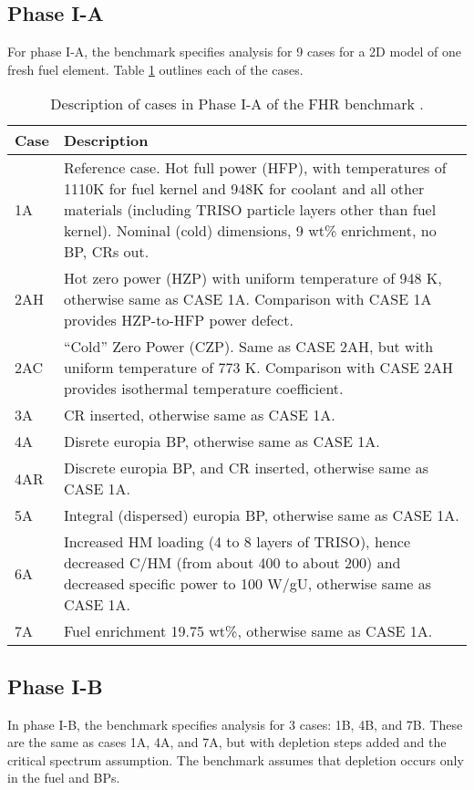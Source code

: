 \subsection{Phase I-A}
For phase I-A, the benchmark specifies analysis for 9 cases for a 2D model of 
one fresh fuel element. 
Table \ref{tab:phase1a-cases} outlines each of the cases. 
\begin{table}[H]
    \centering
    \onehalfspacing
    \caption{Description of cases in Phase I-A of the \gls{FHR} benchmark \cite{noauthor_fluoride_nodate}.}
	\label{tab:phase1a-cases}
    \footnotesize
    \begin{tabular}{p{}|p{}}
    \hline 
    \textbf{Case} & \textbf{Description} \\
    \hline
    1A & Reference case. Hot full power (HFP), with temperatures of 1110K for 
    fuel kernel and 948K for coolant and all other materials (including TRISO 
    particle layers other than fuel kernel). Nominal (cold) dimensions, 
    9 wt\% enrichment, no \gls{BP}, \glspl{CR} out.\\
    \hline
    2AH & Hot zero power (HZP) with uniform temperature of 948 K, 
    otherwise same as CASE 1A. Comparison with CASE 1A provides HZP-to-HFP power 
    defect.\\
    \hline 
    2AC & “Cold” Zero Power (CZP). Same as CASE 2AH, but with uniform temperature 
    of 773 K. Comparison with CASE 2AH provides isothermal temperature coefficient.\\
    \hline
    3A & \gls{CR} inserted, otherwise same as CASE 1A. \\
    \hline
    4A & Disrete europia \gls{BP}, otherwise same as CASE 1A.\\
    \hline
    4AR & Discrete europia \gls{BP}, and \gls{CR} inserted, otherwise same as 
    CASE 1A. \\
    \hline
    5A & Integral (dispersed) europia \gls{BP}, otherwise same as CASE 1A. \\
    \hline
    6A & Increased \gls{HM} loading (4 to 8 layers of \gls{TRISO}), hence decreased C/HM 
    (from about 400 to about 200) and decreased specific power to 100 W/gU, 
    otherwise same as CASE 1A.\\
    \hline 
    7A & Fuel enrichment 19.75 wt\%, otherwise same as CASE 1A.\\
    \hline 
    \end{tabular}
\end{table}

\subsection{Phase I-B}
In phase I-B, the benchmark specifies analysis for 3 cases: 1B, 4B, and 7B. 
These are the same as cases 1A, 4A, and 7A, but with depletion steps added and
the critical spectrum assumption. 
The benchmark assumes that depletion occurs only in the fuel and \glspl{BP}. 

